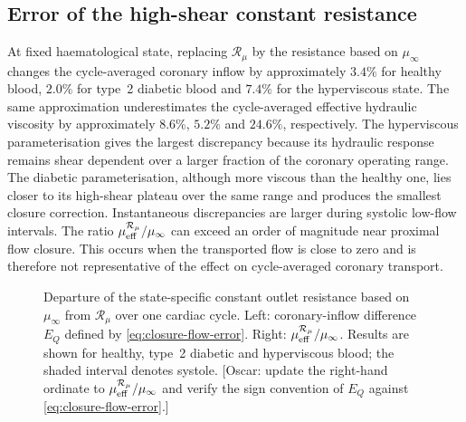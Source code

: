 \documentclass[lineno]{jfm}
\begin{document}
\subsection{Error of the high-shear constant resistance}
\label{sec:results-constant-resistance}
At fixed haematological state, replacing $\mathcal{R}_{\mu}$ by the
resistance based on $\mu_\infty$ changes the cycle-averaged coronary inflow by
approximately $3.4\%$ for healthy blood, $2.0\%$ for type~2 diabetic blood and
$7.4\%$ for the hyperviscous state. The same approximation underestimates the
cycle-averaged effective hydraulic viscosity by approximately $8.6\%$,
$5.2\%$ and $24.6\%$, respectively.
The hyperviscous parameterisation gives the largest discrepancy because its
hydraulic response remains shear dependent over a larger fraction of the
coronary operating range. The diabetic parameterisation, although more viscous
than the healthy one, lies closer to its high-shear plateau over the same
range and produces the smallest closure correction.
Instantaneous discrepancies are larger during systolic low-flow intervals.
The ratio
$\mu_{\rm eff}^{\mathcal{R}_{\mu}}/\mu_\infty$
can exceed an order of magnitude near proximal flow closure. This occurs when
the transported flow is close to zero and is therefore not representative of
the effect on cycle-averaged coronary transport.
\begin{figure}
    \centering
    \fbox{
    \rule{0pt}{0.29\textheight}
    \rule{0.92\textwidth}{0pt}
    }
    \caption{Departure of the state-specific constant outlet resistance based
    on $\mu_\infty$ from $\mathcal{R}_{\mu}$ over one cardiac cycle. Left:
    coronary-inflow difference $E_Q$ defined by
    \eqref{eq:closure-flow-error}. Right:
    $\mu_{\rm eff}^{\mathcal{R}_{\mu}}/\mu_\infty$.
    Results are shown for healthy, type~2 diabetic and hyperviscous blood; the
    shaded interval denotes systole.
    {\color{red}[Oscar: update the right-hand ordinate to
    $\mu_{\rm eff}^{\mathcal{R}_{\mu}}/\mu_\infty$ and verify the sign
    convention of $E_Q$ against \eqref{eq:closure-flow-error}.]}}
    \label{fig:constant-resistance-error}
\end{figure}
\end{document}
